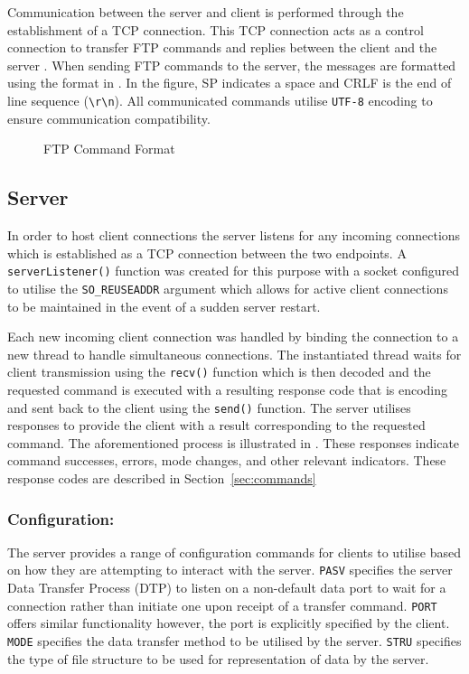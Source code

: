 \documentclass[10pt,twocolumn]{witseiepaper}
\newcommand*{\escape}[1]{\texttt{\textbackslash#1}}
\begin{document}
Communication between the server and client is performed through the establishment of a TCP connection. This TCP connection acts as a control connection to transfer FTP commands and replies between the client and the server \cite{kurose}. When sending FTP commands to the server, the messages are formatted using the format in . In the figure, SP indicates a space and CRLF is the end of line sequence (\escape{r}\escape{n}). All communicated commands utilise \texttt{UTF-8} encoding to ensure communication compatibility.

\begin{figure}[h]
	\centering
	\caption{FTP Command Format}
	\label{fig:commandformat}
\end{figure}

\subsection{Server}
In order to host client connections the server listens for any incoming connections which is established as a TCP connection between the two endpoints. A \texttt{serverListener()} function was created for this purpose with a socket configured to utilise the \texttt{SO\_REUSEADDR} argument which allows for active client connections to be maintained in the event of a sudden server restart. 

Each new incoming client connection was handled by binding the connection to a new thread to handle simultaneous connections. The instantiated thread waits for client transmission using the \texttt{recv()} function which is then decoded and the requested command is executed with a resulting response code that is encoding and sent back to the client using the \texttt{send()} function. The server utilises responses to provide the client with a result corresponding to the requested command. The aforementioned process is illustrated in . These responses indicate command successes, errors, mode changes, and other relevant indicators. These response codes are described in Section~\ref{sec:commands}

\subsubsection*{Configuration:}
The server provides a range of configuration commands for clients to utilise based on how they are attempting to interact with the server. \texttt{PASV} specifies the server Data Transfer Process (DTP) to listen on a non-default data port to wait for a connection rather than initiate one upon receipt of a transfer command. \texttt{PORT} offers similar functionality however, the port is explicitly specified by the client. \texttt{MODE} specifies the data transfer method to be utilised by the server. \texttt{STRU} specifies the type of file structure to be used for representation of data by the server.
\end{document}
